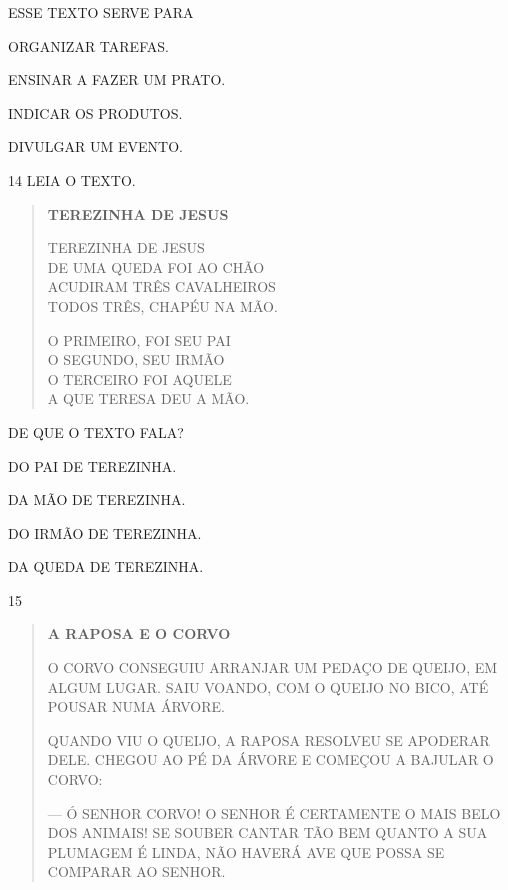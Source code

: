 ESSE TEXTO SERVE PARA

\begin{escolha}
\item ORGANIZAR TAREFAS.

\item ENSINAR A FAZER UM PRATO.

\item INDICAR OS PRODUTOS.

\item DIVULGAR UM EVENTO.
\end{escolha}

\num{14} LEIA O TEXTO. \enlargethispage{2\baselineskip}

\begin{myquote}
\begin{verse}
\textbf{TEREZINHA DE JESUS}

TEREZINHA DE JESUS\\
DE UMA QUEDA FOI AO CHÃO\\
ACUDIRAM TRÊS CAVALHEIROS\\
TODOS TRÊS, CHAPÉU NA MÃO.


O PRIMEIRO, FOI SEU PAI\\
O SEGUNDO, SEU IRMÃO\\
O TERCEIRO FOI AQUELE\\
A QUE TERESA DEU A MÃO.

\end{verse}
\end{myquote}

DE QUE O TEXTO FALA?

\begin{escolha}
\item DO PAI DE TEREZINHA.

\item DA MÃO DE TEREZINHA.

\item DO IRMÃO DE TEREZINHA.

\item DA QUEDA DE TEREZINHA.
\end{escolha}

\num{15} \enlargethispage{2\baselineskip}

\begin{quote}
\textbf{A RAPOSA E O CORVO}

O CORVO CONSEGUIU ARRANJAR UM PEDAÇO DE QUEIJO, EM ALGUM
LUGAR. SAIU VOANDO, COM O QUEIJO NO BICO, ATÉ POUSAR NUMA
ÁRVORE.

QUANDO VIU O QUEIJO, A RAPOSA RESOLVEU SE APODERAR
DELE. CHEGOU AO PÉ DA ÁRVORE E COMEÇOU A BAJULAR O CORVO:

--- Ó SENHOR CORVO! O SENHOR É CERTAMENTE O MAIS BELO
DOS ANIMAIS! SE SOUBER CANTAR TÃO BEM QUANTO A SUA PLUMAGEM
É LINDA, NÃO HAVERÁ AVE QUE POSSA SE COMPARAR AO SENHOR.

\end{quote}

